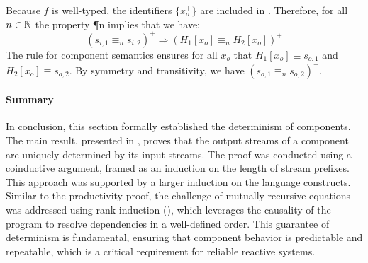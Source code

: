 \begin{skippableproof}
    Because $f$ is well-typed, the identifiers $\{x_o^+\}$ are included in . Therefore,
    for all $n \in \mathbb{N}$ the property \P{n} implies that we have:
    \begin{equation*}
        \left(s_{i, 1} \equiv_n s_{i, 2}\right)^+ \Rightarrow \left(H_1[x_o] \equiv_n H_2[x_o]\right)^+
    \end{equation*}
    The rule for component semantics  ensures for all
    $x_o$ that $H_1[x_o] \equiv s_{o, 1}$ and $H_2[x_o] \equiv s_{o, 2}$. By symmetry and
    transitivity, we have $\left(s_{o, 1} \equiv_n s_{o, 2}\right)^+$.
\end{skippableproof}

\paragraph{Summary}
In conclusion, this section formally established the determinism of \GRSync components. The main
result, presented in , proves that the output
streams of a component are uniquely determined by its input streams.
%
The proof was conducted using a coinductive argument, framed as an induction on the length of stream
prefixes. This approach was supported by a larger induction on the language constructs.
%
Similar to the productivity proof, the challenge of mutually recursive equations was addressed using
rank induction (), which leverages the causality
of the program to resolve dependencies in a well-defined order.
%
This guarantee of determinism is fundamental, ensuring that component behavior is predictable and
repeatable, which is a critical requirement for reliable reactive systems.
